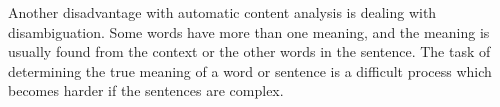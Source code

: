 Another disadvantage with automatic content analysis is dealing with disambiguation. Some words have more than one meaning, and the meaning is usually found from the context or the other words in the sentence. The task of determining the true meaning of a word or sentence is a difficult process which becomes harder if the sentences are complex. 






